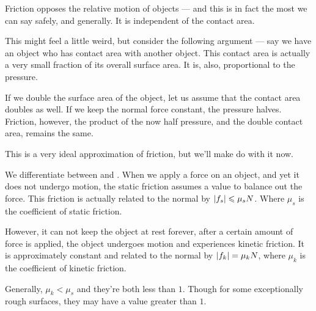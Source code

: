 Friction opposes the relative motion of objects --- and this is in fact the most we 
can say safely, and generally. It is independent of the contact area.

This might feel a little weird, but consider the following argument --- say we have an object 
who has contact area with another object. This contact area is actually a very small fraction 
of its overall surface area. It is, also, proportional to the pressure.

If we double the surface area of the object, let us assume that the contact area doubles as well.
If we keep the normal force constant, the pressure halves. Friction, however, the 
product of the now half pressure, and the double contact area, remains the same.

This is a very ideal approximation of friction, but we'll make do with it now. 

We differentiate between  and . When we apply 
a force on an object, and yet it does not undergo motion, the static friction assumes a value 
to balance out the force. This friction is actually related to the normal by \(\abs{f_s} \leqslant \mu_sN\).
Where \(\mu_s\) is the coefficient of static friction. 

However, it can not keep the object at rest forever, after a certain amount of force is applied, 
the object undergoes motion and experiences kinetic friction. It is approximately constant 
and related to the normal by \(\abs{f_k} = \mu_kN\), where \(\mu_k\) is the coefficient of kinetic friction.

Generally, \(\mu_k < \mu_s\) and they're both less than \(1\). Though for some exceptionally rough surfaces, they
may have a value greater than \(1\).

\begin{marginfigure}
\end{marginfigure}

